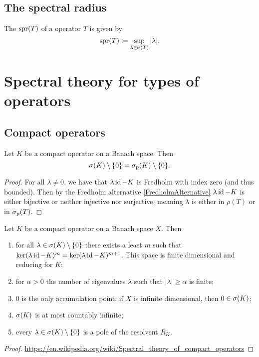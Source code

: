 \subsection{The spectral radius}
\begin{definition}
The  $\operatorname{spr}(T)$ of a operator $T$ is given by
\[ \operatorname{spr}(T) \coloneqq \sup_{\lambda\in\sigma(T)}|\lambda|. \]
\end{definition}


\section{Spectral theory for types of operators}
\subsection{Compact operators}

\begin{proposition}
Let $K$ be a compact operator on a Banach space. Then
\[ \sigma(K)\setminus\{0\} = \sigma_\text{p}(K)\setminus\{0\}. \]
\end{proposition}
\begin{proof}
For all $\lambda\neq 0$, we have that $\lambda\operatorname{id} - K$ is Fredholm with index zero (and thus bounded). Then by the Fredholm alternative \ref{FredholmAlternative} $\lambda\operatorname{id} - K$ is either bijective or neither injective nor surjective, meaning $\lambda$ is either in $\rho(T)$ or in $\sigma_\text{p}(T)$. 
\end{proof}

\begin{proposition} \label{spectrumCompactOperator}
Let $K$ be a compact operator on a Banach space $X$. Then
\begin{enumerate}
\item for all $\lambda\in\sigma(K)\setminus\{0\}$ there exists a least $m$ such that $\ker(\lambda\operatorname{id}- K)^m = \ker(\lambda\operatorname{id}- K)^{m+1}$. This space is finite dimensional and reducing for $K$;
\item for $\alpha > 0$ the number of eigenvalues $\lambda$ such that $|\lambda|\geq \alpha$ is finite;
\item $0$ is the only accumulation point; if $X$ is infinite dimensional, then $0\in\sigma(K)$;
\item $\sigma(K)$ is at most countably infinite;
\item every $\lambda \in \sigma(K)\setminus \{0\}$ is a pole of the resolvent $R_K$.
\end{enumerate}
\end{proposition}
\begin{proof}
\url{https://en.wikipedia.org/wiki/Spectral_theory_of_compact_operators}
\end{proof}



